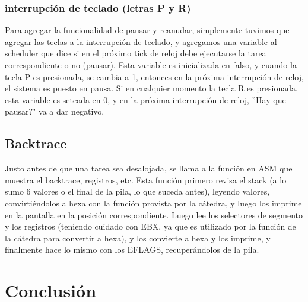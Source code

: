 \documentclass[10pt, a4paper]{article}
\begin{document}
\subsubsection*{interrupción de teclado (letras P y R)}
Para agregar la funcionalidad de pausar y reanudar, simplemente tuvimos que agregar las teclas a la interrupción de teclado, y agregamos una variable al scheduler que dice si en el próximo tick de reloj debe ejecutarse la tarea correspondiente o no (pausar). Esta variable es inicializada en falso, y cuando la tecla P es presionada, se cambia a 1, entonces en la próxima interrupción de reloj, el sistema es puesto en pausa. Si en cualquier momento la tecla R es presionada, esta variable es seteada en 0, y en la próxima interrupción de reloj, ''Hay que pausar?" va a dar negativo.

\subsection{Backtrace}
Justo antes de que una tarea sea desalojada, se llama a la función en ASM que muestra el backtrace, registros, etc.
Esta función primero revisa el stack (a lo sumo 6 valores o el final de la pila, lo que suceda antes), leyendo valores, convirtiéndolos a hexa con la función provista por la cátedra, y luego los imprime en la pantalla en la posición correspondiente. Luego lee los selectores de segmento y los registros (teniendo cuidado con EBX, ya que es utilizado por la función de la cátedra para convertir a hexa), y los convierte a hexa y los imprime, y finalmente hace lo mismo con los EFLAGS, recuperándolos de la pila.



\section{Conclusi\'on}
\end{document}
